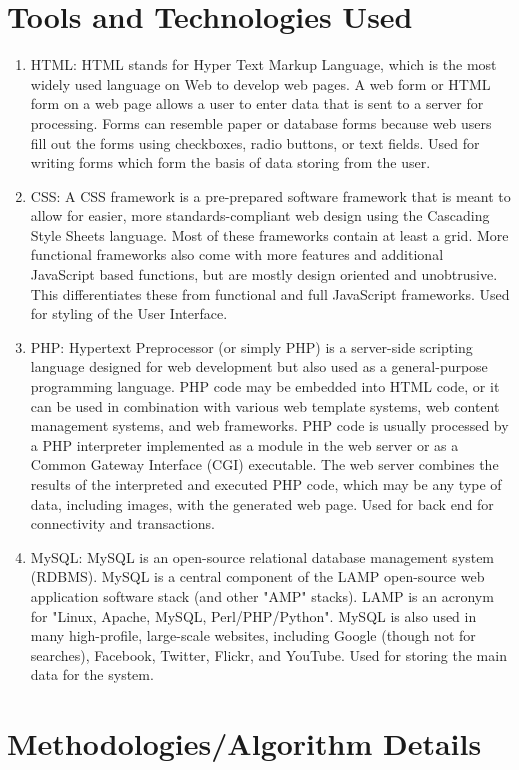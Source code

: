 \documentclass[oneside,a4paper,12pt]{book}
\begin{document}
  \section{Tools and Technologies Used}
  \begin{enumerate}[1.]
 \item HTML:
HTML stands for Hyper Text Markup Language, which is the most widely used language on Web to develop web pages. A web form or HTML form on a web page allows a user to enter data that is sent to a server for processing. Forms can resemble paper or database forms because web users ﬁll out the forms using checkboxes, radio buttons, or text ﬁelds. Used for writing forms which form the basis of data storing from the user.
\item CSS:
A CSS framework is a pre-prepared software framework that is meant to allow for easier, more standards-compliant web design using the Cascading Style Sheets language. Most of these frameworks contain at least a grid. More functional frameworks also come with more features and additional JavaScript based functions, but are mostly design oriented and unobtrusive. This diﬀerentiates these from functional and full JavaScript frameworks. Used for styling of the User Interface.
\item PHP: 
Hypertext Preprocessor (or simply PHP) is a server-side scripting language designed for web development but also used as a general-purpose programming language. PHP code may be embedded into HTML code, or it can be used in combination with various web template systems, web content management systems, and web frameworks. PHP code is usually processed by a PHP interpreter implemented as a module in the web server or as a Common Gateway Interface (CGI) executable. The web server combines the results of the interpreted and executed PHP code, which may be any type of data, including images, with the generated web page. Used for back end for connectivity and transactions.
\item MySQL:
MySQL is an open-source relational database management system (RDBMS). MySQL is a central component of the LAMP open-source web application software stack (and other "AMP" stacks). LAMP is an acronym for "Linux, Apache, MySQL, Perl/PHP/Python". MySQL is also used in many high-profile, large-scale websites, including Google (though not for searches), Facebook, Twitter, Flickr, and YouTube. Used for storing the main data for the system.
  \end{enumerate}
  

  \section{Methodologies/Algorithm Details}
\end{document}
